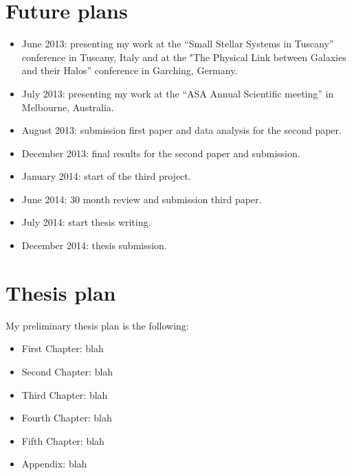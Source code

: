 \documentclass[useAMS,usenatbib,onecolumn]{mnras}
\begin{document}
\section{Future plans}
\label{sec:future}  
\begin{itemize}
\item{June 2013:} presenting my work at the ``Small Stellar Systems in Tuscany'' conference in Tuscany, Italy and at the 
                     "The Physical Link between Galaxies and their Halos'' conference in Garching, Germany. 
\item{July 2013:} presenting my work at the ``ASA Annual Scientific meeting'' in Melbourne, Australia.
\item{August 2013:} submission first paper and data analysis for the second paper.
\item{December 2013:} final results for the second paper and submission.
\item{January 2014:} start of the third project.
\item{June 2014:} 30 month review and submission third paper.
\item{July 2014:} start thesis writing.
\item{December 2014:} thesis submission.

\end{itemize}



\section{Thesis plan}
\label{sec:thesis} 

My preliminary thesis plan is the following:
\begin{itemize}
\item{First Chapter: } blah
\item{Second Chapter:} blah
\item{Third Chapter:} blah
\item{Fourth Chapter:} blah
\item{Fifth Chapter:} blah
\item{Appendix:} blah
\end{itemize}
\end{document}
